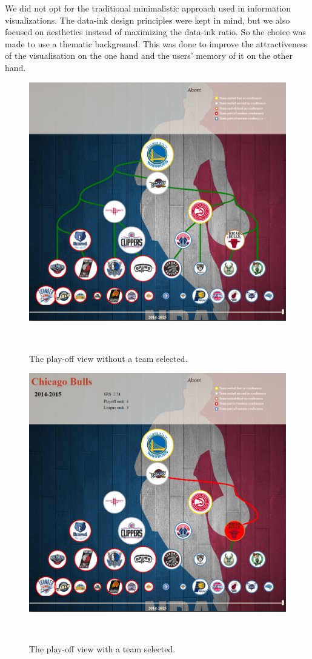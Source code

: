 \documentclass[chi_draft]{sigchi}
\begin{document}
We did not opt for the traditional minimalistic approach used in information 
visualizations. The data-ink design principles were kept in mind, but we also 
focused on aesthetics instead of maximizing the data-ink ratio. So the choice 
was made to use a thematic background. This was done to improve the 
attractiveness of the visualisation on the one hand and the users' memory of 
it on the other hand\cite{aesthetics}. 

\begin{figure}
\centering
  \includegraphics[width=1.0\columnwidth]{figures/playoffviewwithcontext}
  \caption{The play-off view without a team selected.}~\label{fig:playoffviewnoteam}
\end{figure}

\begin{figure}
\centering
  \includegraphics[width=1.0\columnwidth]{figures/playoffviewteamselected}
  \caption{The play-off view with a team selected.}~\label{fig:playoffviewteam}
\end{figure}
\end{document}

